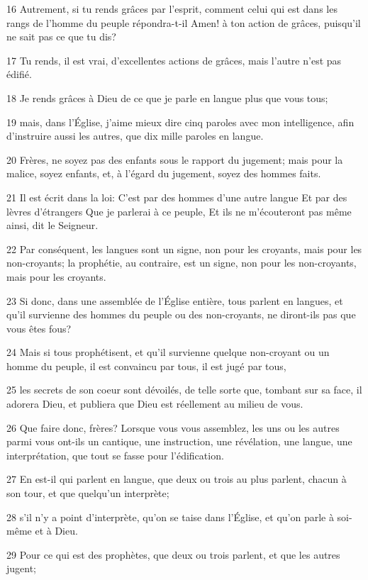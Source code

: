 \par 16 Autrement, si tu rends grâces par l'esprit, comment celui qui est dans les rangs de l'homme du peuple répondra-t-il Amen! à ton action de grâces, puisqu'il ne sait pas ce que tu dis?
\par 17 Tu rends, il est vrai, d'excellentes actions de grâces, mais l'autre n'est pas édifié.
\par 18 Je rends grâces à Dieu de ce que je parle en langue plus que vous tous;
\par 19 mais, dans l'Église, j'aime mieux dire cinq paroles avec mon intelligence, afin d'instruire aussi les autres, que dix mille paroles en langue.
\par 20 Frères, ne soyez pas des enfants sous le rapport du jugement; mais pour la malice, soyez enfants, et, à l'égard du jugement, soyez des hommes faits.
\par 21 Il est écrit dans la loi: C'est par des hommes d'une autre langue Et par des lèvres d'étrangers Que je parlerai à ce peuple, Et ils ne m'écouteront pas même ainsi, dit le Seigneur.
\par 22 Par conséquent, les langues sont un signe, non pour les croyants, mais pour les non-croyants; la prophétie, au contraire, est un signe, non pour les non-croyants, mais pour les croyants.
\par 23 Si donc, dans une assemblée de l'Église entière, tous parlent en langues, et qu'il survienne des hommes du peuple ou des non-croyants, ne diront-ils pas que vous êtes fous?
\par 24 Mais si tous prophétisent, et qu'il survienne quelque non-croyant ou un homme du peuple, il est convaincu par tous, il est jugé par tous,
\par 25 les secrets de son coeur sont dévoilés, de telle sorte que, tombant sur sa face, il adorera Dieu, et publiera que Dieu est réellement au milieu de vous.
\par 26 Que faire donc, frères? Lorsque vous vous assemblez, les uns ou les autres parmi vous ont-ils un cantique, une instruction, une révélation, une langue, une interprétation, que tout se fasse pour l'édification.
\par 27 En est-il qui parlent en langue, que deux ou trois au plus parlent, chacun à son tour, et que quelqu'un interprète;
\par 28 s'il n'y a point d'interprète, qu'on se taise dans l'Église, et qu'on parle à soi-même et à Dieu.
\par 29 Pour ce qui est des prophètes, que deux ou trois parlent, et que les autres jugent;
